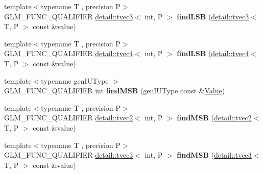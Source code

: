 \begin{DoxyCompactItemize}
\item 
{\footnotesize template$<$typename T , precision P$>$ }\\G\+L\+M\+\_\+\+F\+U\+N\+C\+\_\+\+Q\+U\+A\+L\+I\+F\+I\+ER \hyperlink{structglm_1_1detail_1_1tvec3}{detail\+::tvec3}$<$ int, P $>$ {\bfseries find\+L\+SB} (\hyperlink{structglm_1_1detail_1_1tvec3}{detail\+::tvec3}$<$ T, P $>$ const \&value)\hypertarget{namespaceglm_a84e800d8d8e6526be81c6f5adcc275a8}{}\label{namespaceglm_a84e800d8d8e6526be81c6f5adcc275a8}

\item 
{\footnotesize template$<$typename T , precision P$>$ }\\G\+L\+M\+\_\+\+F\+U\+N\+C\+\_\+\+Q\+U\+A\+L\+I\+F\+I\+ER \hyperlink{structglm_1_1detail_1_1tvec4}{detail\+::tvec4}$<$ int, P $>$ {\bfseries find\+L\+SB} (\hyperlink{structglm_1_1detail_1_1tvec4}{detail\+::tvec4}$<$ T, P $>$ const \&value)\hypertarget{namespaceglm_a8e4e6525d3aa43da17a5c34b782b6b99}{}\label{namespaceglm_a8e4e6525d3aa43da17a5c34b782b6b99}

\item 
{\footnotesize template$<$typename gen\+I\+U\+Type $>$ }\\G\+L\+M\+\_\+\+F\+U\+N\+C\+\_\+\+Q\+U\+A\+L\+I\+F\+I\+ER int {\bfseries find\+M\+SB} (gen\+I\+U\+Type const \&\hyperlink{document_8h_a071cf97155ba72ac9a1fc4ad7e63d481}{Value})\hypertarget{namespaceglm_adc22c75c7dd35bacf86237d8bfe8b53a}{}\label{namespaceglm_adc22c75c7dd35bacf86237d8bfe8b53a}

\item 
{\footnotesize template$<$typename T , precision P$>$ }\\G\+L\+M\+\_\+\+F\+U\+N\+C\+\_\+\+Q\+U\+A\+L\+I\+F\+I\+ER \hyperlink{structglm_1_1detail_1_1tvec2}{detail\+::tvec2}$<$ int, P $>$ {\bfseries find\+M\+SB} (\hyperlink{structglm_1_1detail_1_1tvec2}{detail\+::tvec2}$<$ T, P $>$ const \&value)\hypertarget{namespaceglm_af4a84b6df7edb51f4b6a612021ef7999}{}\label{namespaceglm_af4a84b6df7edb51f4b6a612021ef7999}

\item 
{\footnotesize template$<$typename T , precision P$>$ }\\G\+L\+M\+\_\+\+F\+U\+N\+C\+\_\+\+Q\+U\+A\+L\+I\+F\+I\+ER \hyperlink{structglm_1_1detail_1_1tvec3}{detail\+::tvec3}$<$ int, P $>$ {\bfseries find\+M\+SB} (\hyperlink{structglm_1_1detail_1_1tvec3}{detail\+::tvec3}$<$ T, P $>$ const \&value)\hypertarget{namespaceglm_a9d435c4aca98a82adffb2a49a38d0019}{}\label{namespaceglm_a9d435c4aca98a82adffb2a49a38d0019}


\end{DoxyCompactItemize}
